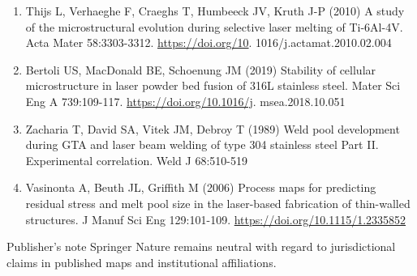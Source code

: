 \documentclass[10pt]{article}
\begin{document}
\begin{enumerate}
  \item Thijs L, Verhaeghe F, Craeghs T, Humbeeck JV, Kruth J-P (2010) A study of the microstructural evolution during selective laser melting of Ti-6Al-4V. Acta Mater 58:3303-3312. \href{https://doi.org/10}{https://doi.org/10}. 1016/j.actamat.2010.02.004

  \item Bertoli US, MacDonald BE, Schoenung JM (2019) Stability of cellular microstructure in laser powder bed fusion of 316L stainless steel. Mater Sci Eng A 739:109-117. \href{https://doi.org/10.1016/j}{https://doi.org/10.1016/j}. msea.2018.10.051

  \item Zacharia T, David SA, Vitek JM, Debroy T (1989) Weld pool development during GTA and laser beam welding of type 304 stainless steel Part II. Experimental correlation. Weld J 68:510-519

  \item Vasinonta A, Beuth JL, Griffith M (2006) Process maps for predicting residual stress and melt pool size in the laser-based fabrication of thin-walled structures. J Manuf Sci Eng 129:101-109. \href{https://doi.org/10.1115/1.2335852}{https://doi.org/10.1115/1.2335852}

\end{enumerate}

Publisher's note Springer Nature remains neutral with regard to jurisdictional claims in published maps and institutional affiliations.
\end{document}
